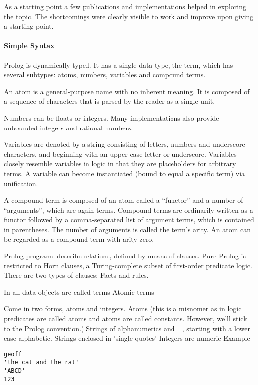 \documentclass[thesis-solanki.tex]{subfiles}
\begin{document}
As a starting point a few publications and implementations helped in exploring the topic. The shortcomings were clearly visible to work and
improve upon giving a starting point.


\paragraph{Simple Syntax}
\cite{wikiprolog}

Prolog is dynamically typed. It has a single data type, the term, which has several subtypes: atoms, numbers, variables and compound terms.

An atom is a general-purpose name with no inherent meaning. It is composed of a sequence of characters that is parsed by the 
reader 
as a single unit.

Numbers can be floats or integers. Many 
 implementations also provide unbounded integers and rational numbers.

Variables are denoted by a string consisting of letters, numbers and underscore characters, and beginning with an upper-case letter or 
underscore. Variables closely resemble variables in logic in that they are placeholders for arbitrary terms. A variable can become 
instantiated (bound to equal a specific term) via unification.

A compound term is composed of an atom called a ``functor'' and a number of ``arguments'', which are again terms. Compound terms are 
ordinarily 
written as a functor followed by a comma-separated list of argument terms, which is contained in parentheses. The number of arguments is 
called the term's arity. An atom can be regarded as a compound term with arity zero.

Prolog programs describe relations, defined by means of clauses. Pure Prolog is restricted to Horn clauses, a Turing-complete subset of 
first-order predicate logic. There are two types of clauses: Facts and rules.

\cite{website:prologintroumiami}
In 
 all data objects are called terms
 Atomic terms

Come in two forms, atoms and integers.
Atoms (this is a misnomer as in logic predicates are called atoms and atoms are called constants. However, we'll stick to the Prolog convention.)
Strings of alphanumerics and \_, starting with a lower case alphabetic.
Strings enclosed in 'single quotes'
Integers are numeric
Example
\par
\begin{verbatim}
geoff
'the cat and the rat'
'ABCD'
123
\end{verbatim}
     
\end{document}
